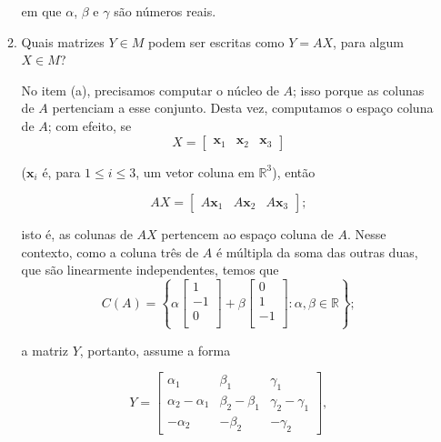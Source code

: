 \documentclass[leqno]{article}
\begin{document}
\begin{enumerate}
\begin{enumerate}
\begin{sol}
		\noindent em que $\alpha$, $\beta$ e $\gamma$ são números reais. 
	\end{sol} 
\item Quais matrizes $Y \in M$ podem ser escritas como $Y = AX$, para algum $X \in M$?

	\begin{sol} 
		No item (a), precisamos computar o núcleo de $A$; isso porque as colunas de $A$ pertenciam a esse conjunto. Desta vez, computamos o espaço coluna de $A$; com efeito, se 
		\begin{equation*} 
			X = 
			\begin{bmatrix} 
				\mathbf{x}_{1} & \mathbf{x}_{2} & \mathbf{x}_{3}    
			\end{bmatrix}  
		\end{equation*} 
	
		\noindent ($\mathbf{x}_{i}$ é, para $1 \le i \le 3$, um vetor coluna em $\mathbb{R}^{3}$), então 
		
		\begin{equation*} 
			AX = 
			\begin{bmatrix} 
				A\mathbf{x}_{1} & A\mathbf{x}_{2} & A\mathbf{x}_{3}     
			\end{bmatrix}; 
		\end{equation*}  

		\noindent isto é, as colunas de $AX$ pertencem ao espaço coluna de $A$. Nesse contexto, como a coluna três de $A$ é múltipla da soma das outras duas, que são linearmente independentes, temos que 
		\begin{equation*} 
			C(A) = 
			\left\{ \alpha 
				\begin{bmatrix} 
					1 \\ 
					-1 \\ 
					0 \\ 
				\end{bmatrix} + 
				\beta  
				\begin{bmatrix} 
					0 \\ 
					1 \\ 
					-1 \\ 
				\end{bmatrix} : 
				\alpha, \beta \in \mathbb{R} 
			\right\}; 
		\end{equation*} 
		
		\noindent a matriz $Y$, portanto, assume a forma 

		\begin{equation*} 
			Y = 
			\begin{bmatrix} 
				\alpha_{1} & \beta_{1} & \gamma_{1} \\ 
				\alpha_{2} - \alpha_{1} & \beta_{2} - \beta_{1} & \gamma_{2} - \gamma_{1} \\ 
				-\alpha_{2} & -\beta_{2} & -\gamma_{2} 
			\end{bmatrix}, 
		\end{equation*} 


\end{sol}
\end{enumerate}
\end{enumerate}
\end{document}

